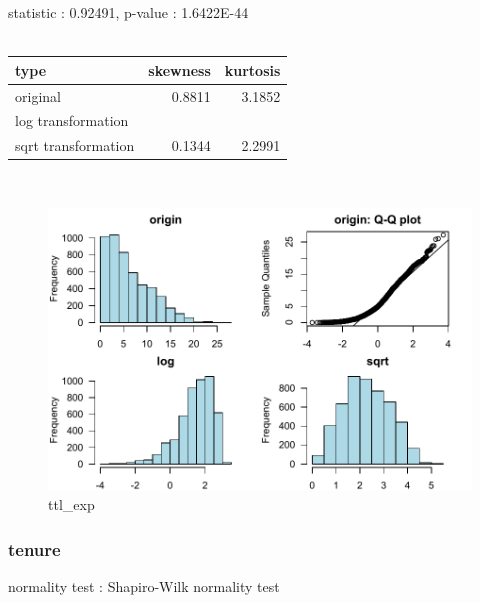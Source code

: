 \documentclass{book}\usepackage[]{graphicx}\usepackage[]{color}
\begin{document}
\noindent statistic : 0.92491,  p-value : 1.6422E-44\\
\\%
\begin{tabular}{lrr}
  \toprule
type & skewness & kurtosis \\ 
  \midrule
original & 0.8811 & 3.1852 \\ 
  log transformation &  &  \\ 
  sqrt transformation & 0.1344 & 2.2991 \\ 
   \bottomrule
\end{tabular}
\\
\begin{figure}[!ht]
\centering
\includegraphics[width=1.0\textwidth]{figure/norm17.pdf}
\caption{ttl\_exp}
\end{figure}
\clearpage
\subsubsection{ tenure }

normality test : Shapiro-Wilk normality test
\end{document}
